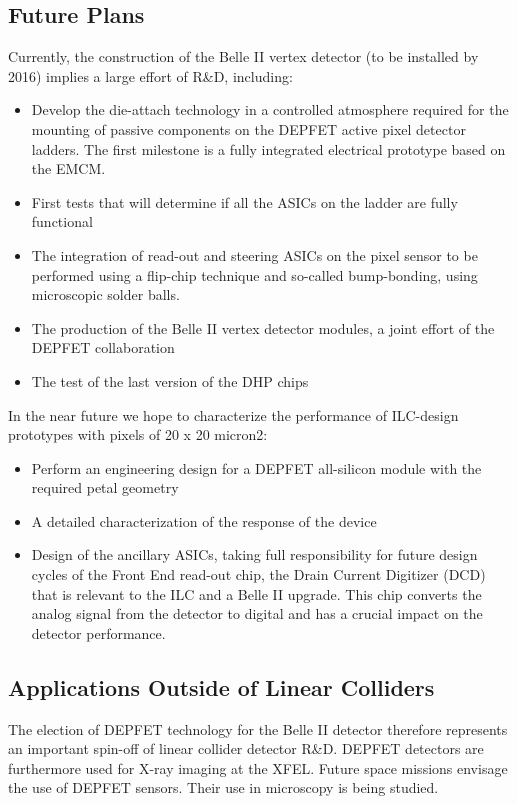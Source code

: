 \subsection{Future Plans}
Currently, the construction of the Belle II vertex detector (to be installed by 2016) implies a large effort of R\&D, including:
\begin{itemize}
\item Develop the die-attach technology in a controlled atmosphere required for the mounting of passive components on the DEPFET active pixel detector ladders. The first milestone is a fully integrated electrical prototype based on the EMCM.
\item First tests that will determine if all the ASICs on the ladder are fully functional
\item The integration of read-out and steering ASICs on the pixel sensor to be performed using a flip-chip technique and so-called bump-bonding, using microscopic solder balls.
\item The production of the Belle II vertex detector modules, a joint effort of the DEPFET collaboration
\item The test of the last version of the DHP chips
\end{itemize}
In the near future we hope to characterize the performance of ILC-design prototypes with
pixels of 20 x 20 micron2:
\begin{itemize}
\item Perform an engineering design for a DEPFET all-silicon module with the required petal geometry
\item A detailed characterization of the response of the device
\item Design of the ancillary ASICs, taking full responsibility for future design cycles of the Front End read-out chip, the Drain Current Digitizer (DCD) that is relevant to the ILC and a Belle II upgrade. This chip converts the analog signal from the detector to digital and has a crucial impact on the detector performance.
\end{itemize}
\subsection{Applications Outside of Linear Colliders}
The election of DEPFET technology for the Belle II detector therefore represents an important spin-off of linear collider detector R\&D. DEPFET detectors are furthermore used for X-ray imaging at the XFEL. Future space missions envisage the use of DEPFET sensors. Their use in microscopy is being studied.

